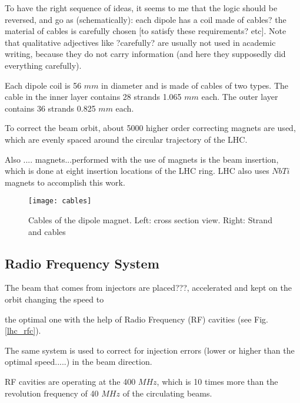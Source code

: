 %

To have the right sequence of ideas, it seems to me that the logic should be reversed, and go as (schematically): each dipole has a coil made of cables? the material of cables is carefully chosen [to satisfy these requirements? etc].
    Note that qualitative adjectives like ?carefully? are usually not used in academic writing, because they do not carry information (and here they supposedly did everything carefully).
 


Each dipole coil is 56 $mm$ in diameter and is made of cables of two types. The cable in the inner layer contains 28 strands 1.065 $mm$ each. The outer layer contains 36 strands 0.825 $mm$ each. 

To correct the beam orbit, about 5000 higher order correcting magnets are used, which are evenly spaced around the circular trajectory of the LHC. 



Also .... magnets...performed with the use of magnets is the beam insertion, which is done at eight insertion locations of the LHC ring. LHC also uses $NbTi$ magnets to accomplish this work. 


\begin{figure}[H]
  \centering
  \texttt{[image: cables]}
  \caption[Cables of the dipole magnet]{Cables of the dipole magnet. Left: cross section view. Right: Strand and cables}\label{cables}
\end{figure}



\subsection{Radio Frequency System}\label{sec:rf}

The beam that comes from injectors are placed???, accelerated and kept on the orbit changing the speed to 

the optimal one with the help of Radio Frequency (RF) cavities (see Fig. \ref{lhc_rfc}). 

The same system is used to correct for injection errors (lower or higher than the optimal speed.....) in the beam direction. 

RF cavities are operating at the 400 $MHz$, which is 10 times more than the revolution frequency of 40 $MHz$ of the circulating beams. 

